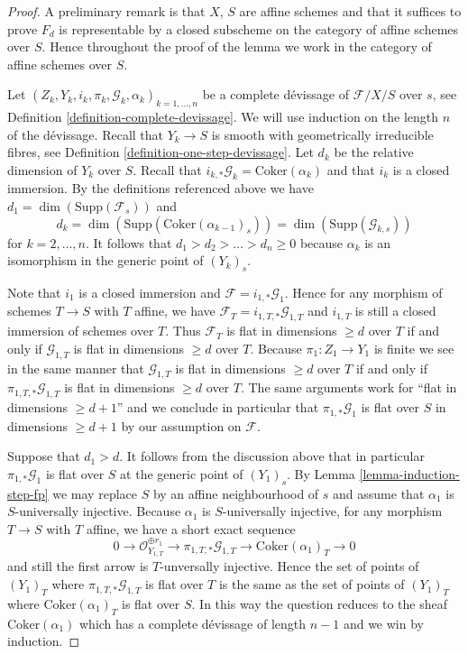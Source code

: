 \begin{proof}
A preliminary remark is that $X$, $S$ are affine schemes and that it
suffices to prove $F_d$ is representable by a closed subscheme on the
category of affine schemes over $S$. Hence throughout the proof of
the lemma we work in the category of affine schemes over $S$.

\medskip\noindent
Let $(Z_k, Y_k, i_k, \pi_k, \mathcal{G}_k, \alpha_k)_{k = 1, \ldots, n}$
be a complete d\'evissage of $\mathcal{F}/X/S$ over $s$, see
Definition \ref{definition-complete-devissage}.
We will use induction on the length $n$ of the d\'evissage.
Recall that $Y_k \to S$ is smooth with geometrically irreducible fibres, see
Definition \ref{definition-one-step-devissage}.
Let $d_k$ be the relative dimension of $Y_k$ over $S$.
Recall that $i_{k, *}\mathcal{G}_k = \text{Coker}(\alpha_k)$ and
that $i_k$ is a closed immersion.
By the definitions referenced above we have
$d_1 = \dim(\text{Supp}(\mathcal{F}_s))$ and
$$
d_k = \dim(\text{Supp}(\text{Coker}(\alpha_{k - 1})_s))
= \dim(\text{Supp}(\mathcal{G}_{k, s}))
$$
for $k = 2, \ldots, n$. It follows that $d_1 > d_2 > \ldots > d_n \geq 0$
because $\alpha_k$ is an isomorphism in the generic point of $(Y_k)_s$.

\medskip\noindent
Note that $i_1$ is a closed immersion and
$\mathcal{F} = i_{1, *}\mathcal{G}_1$.
Hence for any morphism of schemes $T \to S$ with $T$ affine,
we have $\mathcal{F}_T = i_{1, T, *}\mathcal{G}_{1, T}$ and
$i_{1, T}$ is still a closed immersion of schemes over $T$.
Thus $\mathcal{F}_T$ is flat in dimensions $\geq d$ over $T$
if and only if $\mathcal{G}_{1, T}$ is flat in dimensions $\geq d$ over $T$.
Because $\pi_1 : Z_1 \to Y_1$ is finite we see in the same manner that
$\mathcal{G}_{1, T}$ is flat in dimensions $\geq d$ over $T$
if and only if $\pi_{1, T, *}\mathcal{G}_{1, T}$ is flat in dimensions
$\geq d$ over $T$. The same arguments work for
``flat in dimensions $\geq d + 1$'' and we conclude in particular that
$\pi_{1, *}\mathcal{G}_1$ is flat over $S$ in dimensions $\geq d + 1$
by our assumption on $\mathcal{F}$.

\medskip\noindent
Suppose that $d_1 > d$. It follows from the discussion above that
in particular $\pi_{1, *}\mathcal{G}_1$ is flat over $S$ at
the generic point of $(Y_1)_s$. By
Lemma \ref{lemma-induction-step-fp}
we may replace $S$ by an affine neighbourhood of $s$ and assume that
$\alpha_1$ is $S$-universally injective. Because $\alpha_1$ is
$S$-universally injective, for any morphism $T \to S$ with $T$ affine,
we have a short exact sequence
$$
0 \to \mathcal{O}_{Y_{1, T}}^{\oplus r_1}
\to \pi_{1, T, *}\mathcal{G}_{1, T} \to \text{Coker}(\alpha_1)_T \to 0
$$
and still the first arrow is $T$-unversally injective. Hence the set
of points of $(Y_1)_T$ where $\pi_{1, T, *}\mathcal{G}_{1, T}$ is flat over
$T$ is the same as the set of points of $(Y_1)_T$ where
$\text{Coker}(\alpha_1)_T$ is flat over $S$. In this way the question
reduces to the sheaf $\text{Coker}(\alpha_1)$ which has a complete
d\'evissage of length $n - 1$ and we win by induction.


\end{proof}
